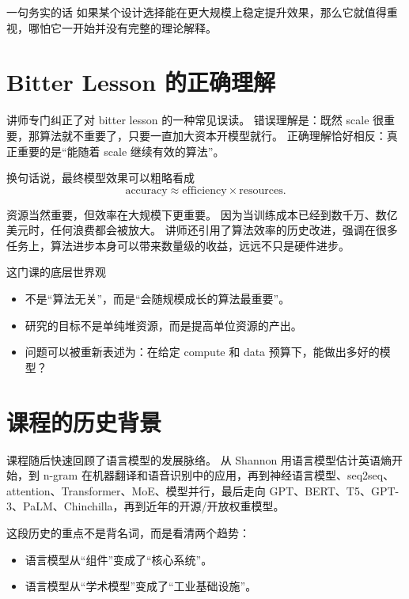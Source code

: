\documentclass[a4paper]{article}
\begin{document}
\begin{importantbox}{一句务实的话}
如果某个设计选择能在更大规模上稳定提升效果，那么它就值得重视，哪怕它一开始并没有完整的理论解释。
\end{importantbox}

\section{Bitter Lesson 的正确理解}

讲师专门纠正了对 bitter lesson 的一种常见误读。
错误理解是：既然 scale 很重要，那算法就不重要了，只要一直加大资本开模型就行。
正确理解恰好相反：真正重要的是“能随着 scale 继续有效的算法”。

换句话说，最终模型效果可以粗略看成
\[
\text{accuracy} \approx \text{efficiency} \times \text{resources}.
\]

资源当然重要，但效率在大规模下更重要。
因为当训练成本已经到数千万、数亿美元时，任何浪费都会被放大。
讲师还引用了算法效率的历史改进，强调在很多任务上，算法进步本身可以带来数量级的收益，远远不只是硬件进步。

\begin{knowledgebox}{这门课的底层世界观}
\begin{itemize}
    \item 不是“算法无关”，而是“会随规模成长的算法最重要”。
    \item 研究的目标不是单纯堆资源，而是提高单位资源的产出。
    \item 问题可以被重新表述为：在给定 compute 和 data 预算下，能做出多好的模型？
\end{itemize}
\end{knowledgebox}

\section{课程的历史背景}

课程随后快速回顾了语言模型的发展脉络。
从 Shannon 用语言模型估计英语熵开始，到 n-gram 在机器翻译和语音识别中的应用，再到神经语言模型、seq2seq、attention、Transformer、MoE、模型并行，最后走向 GPT、BERT、T5、GPT-3、PaLM、Chinchilla，再到近年的开源/开放权重模型。

这段历史的重点不是背名词，而是看清两个趋势：
\begin{itemize}
    \item 语言模型从“组件”变成了“核心系统”。
    \item 语言模型从“学术模型”变成了“工业基础设施”。
\end{itemize}
\end{document}

